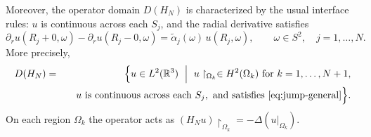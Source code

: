 \documentclass[a4paper,11pt]{article}
\numberwithin{equation}{section}
\def\re{\mathbb{R}}
\theoremstyle{definition}
\theoremstyle{remark}
\begin{document}
Moreover, the operator domain $D(H_N)$ is characterized by the usual interface rules:
$u$ is continuous across each $S_j$, and the radial derivative satisfies
\begin{equation}\label{eq:jump-general}
\partial_r u(R_j+0,\omega)-\partial_r u(R_j-0,\omega)
=
\widetilde\alpha_j(\omega)\,u(R_j,\omega),
\qquad
\omega\in S^2,\quad j=1,\dots,N.
\end{equation}
More precisely,
\begin{eqnarray}\label{eq:dom-HN}
D(H_N)
&=&
\Bigl\{
u\in L^2(\re^3)\ \Bigm|\ 
u\upharpoonright_{\Omega_k}\in H^2(\Omega_k)\ \text{for }k=1,\dots,N+1,\nonumber\\
&&\quad
u\ \text{is continuous across each }S_j,\
\text{and satisfies \eqref{eq:jump-general}}
\Bigr\}.
\end{eqnarray}
On each region $\Omega_k$ the operator acts as $(H_Nu)\upharpoonright_{\Omega_k}=-\Delta(u|_{\Omega_k})$.
\end{document}
